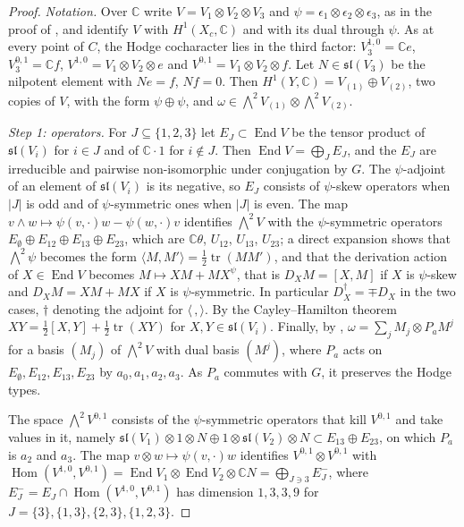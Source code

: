 \documentclass[11pt,reqno]{amsart}
\theoremstyle{plain}
\theoremstyle{definition}
\theoremstyle{remark}
\newcommand{\CC}{\mathbb{C}}
\DeclareMathOperator{\End}{End}
\DeclareMathOperator{\Hom}{Hom}
\begin{document}
\begin{proof}
\emph{Notation.} Over $\CC$ write $V=V_{1}\otimes V_{2}\otimes V_{3}$ and
$\psi=\epsilon_{1}\otimes\epsilon_{2}\otimes\epsilon_{3}$, as in the proof of
, and identify $V$ with $H^{1}(X_{c},\CC)$ and with its
dual through $\psi$. As at every point of $C$, the Hodge cocharacter lies in
the third factor: $V_{3}^{1,0}=\CC e$, $V_{3}^{0,1}=\CC f$, $V^{1,0}=V_{1}
\otimes V_{2}\otimes e$ and $V^{0,1}=V_{1}\otimes V_{2}\otimes f$. Let
$N\in\mathfrak{sl}(V_{3})$ be the nilpotent element with $Ne=f$, $Nf=0$. Then
$H^{1}(Y,\CC)=V_{(1)}\oplus V_{(2)}$, two copies of $V$, with the form
$\psi\oplus\psi$, and $\omega\in{\textstyle\bigwedge^{2}}V_{(1)}\otimes
{\textstyle\bigwedge^{2}}V_{(2)}$.

\emph{Step 1: operators.} For $J\subseteq\{1,2,3\}$ let $E_{J}\subset\End V$
be the tensor product of $\mathfrak{sl}(V_{i})$ for $i\in J$ and of $\CC\cdot1$
for $i\notin J$. Then $\End V=\bigoplus_{J}E_{J}$, and the $E_{J}$ are
irreducible and pairwise non-isomorphic under conjugation by $G$. The
$\psi$-adjoint of an element of $\mathfrak{sl}(V_{i})$ is its negative, so
$E_{J}$ consists of $\psi$-skew operators when $|J|$ is odd and of
$\psi$-symmetric ones when $|J|$ is even. The map $v\wedge w\mapsto
\psi(v,\cdot)w-\psi(w,\cdot)v$ identifies ${\textstyle\bigwedge^{2}}V$ with the
$\psi$-symmetric operators $E_{\emptyset}\oplus E_{12}\oplus E_{13}\oplus
E_{23}$, which are $\CC\theta$, $U_{12}$, $U_{13}$, $U_{23}$; a direct
expansion shows that ${\textstyle\bigwedge^{2}}\psi$ becomes the form
$\langle M,M'\rangle=\frac12\operatorname{tr}(MM')$, and that the derivation
action of $X\in\End V$ becomes $M\mapsto XM+MX^{\psi}$, that is
$D_{X}M=[X,M]$ if $X$ is $\psi$-skew and $D_{X}M=XM+MX$ if $X$ is
$\psi$-symmetric. In particular $D_{X}^{\dagger}=\mp D_{X}$ in the two cases,
$\dagger$ denoting the adjoint for $\langle\,,\rangle$. By the Cayley--Hamilton
theorem $XY=\frac12[X,Y]+\frac12\operatorname{tr}(XY)$ for
$X,Y\in\mathfrak{sl}(V_{i})$. Finally, by ,
$\omega=\sum_{j}M_{j}\otimes P_{a}M^{j}$ for a basis $(M_{j})$ of
${\textstyle\bigwedge^{2}}V$ with dual basis $(M^{j})$, where $P_{a}$ acts on
$E_{\emptyset},E_{12},E_{13},E_{23}$ by $a_{0},a_{1},a_{2},a_{3}$. As $P_{a}$
commutes with $G$, it preserves the Hodge types.

The space ${\textstyle\bigwedge^{2}}V^{0,1}$ consists of the $\psi$-symmetric
operators that kill $V^{0,1}$ and take values in it, namely
$\mathfrak{sl}(V_{1})\otimes1\otimes N\oplus1\otimes\mathfrak{sl}(V_{2})
\otimes N\subset E_{13}\oplus E_{23}$, on which $P_{a}$ is $a_{2}$ and $a_{3}$.
The map $v\otimes w\mapsto\psi(v,\cdot)w$ identifies $V^{0,1}\otimes V^{0,1}$
with $\Hom(V^{1,0},V^{0,1})=\End V_{1}\otimes\End V_{2}\otimes\CC N=
\bigoplus_{J\ni3}E_{J}^{-}$, where $E_{J}^{-}=E_{J}\cap\Hom(V^{1,0},V^{0,1})$
has dimension $1,3,3,9$ for $J=\{3\},\{1,3\},\{2,3\},\{1,2,3\}$.


\end{proof}
\end{document}

